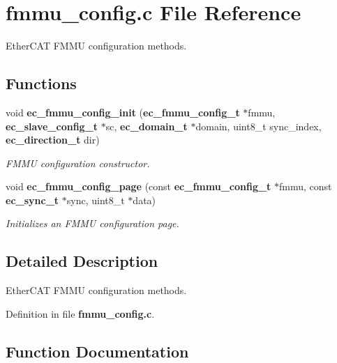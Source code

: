\section{fmmu\-\_\-config.\-c File Reference}
\label{fmmu__config_8c}


Ether\-C\-A\-T F\-M\-M\-U configuration methods.  


\subsection*{Functions}
\begin{DoxyCompactItemize}
\item 
void {\bf ec\-\_\-fmmu\-\_\-config\-\_\-init} ({\bf ec\-\_\-fmmu\-\_\-config\-\_\-t} $\ast$fmmu, {\bf ec\-\_\-slave\-\_\-config\-\_\-t} $\ast$sc, {\bf ec\-\_\-domain\-\_\-t} $\ast$domain, uint8\-\_\-t sync\-\_\-index, {\bf ec\-\_\-direction\-\_\-t} dir)
\begin{DoxyCompactList}\small\item\em F\-M\-M\-U configuration constructor. \end{DoxyCompactList}\item 
void {\bf ec\-\_\-fmmu\-\_\-config\-\_\-page} (const {\bf ec\-\_\-fmmu\-\_\-config\-\_\-t} $\ast$fmmu, const {\bf ec\-\_\-sync\-\_\-t} $\ast$sync, uint8\-\_\-t $\ast$data)
\begin{DoxyCompactList}\small\item\em Initializes an F\-M\-M\-U configuration page. \end{DoxyCompactList}\end{DoxyCompactItemize}


\subsection{Detailed Description}
Ether\-C\-A\-T F\-M\-M\-U configuration methods. 

Definition in file {\bf fmmu\-\_\-config.\-c}.



\subsection{Function Documentation}
